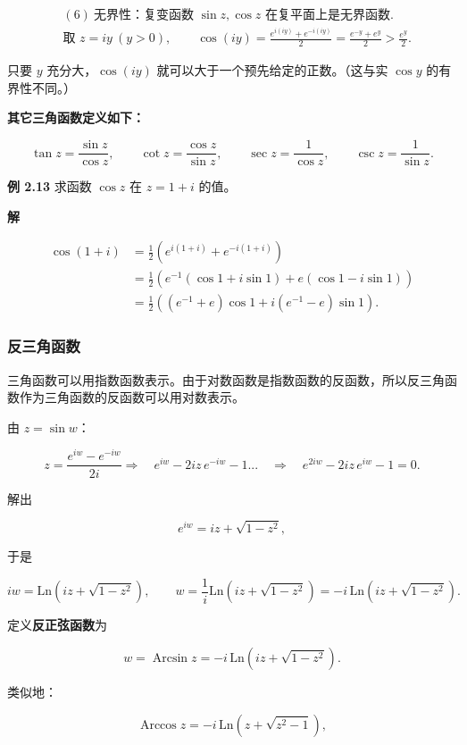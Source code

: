 \[
\begin{aligned}
&(6)\ \text{无界性：复变函数 }\sin z,\cos z\text{ 在复平面上是无界函数}.\\
&\text{取 }z=iy\ (y>0),\qquad
\cos(iy)=\frac{e^{i(iy)}+e^{-i(iy)}}{2}
=\frac{e^{-y}+e^{y}}{2}>\frac{e^y}{2}.
\end{aligned}
\]

只要 \(y\) 充分大，\(\cos(iy)\) 就可以大于一个预先给定的正数。（这与实
\(\cos y\) 的有界性不同。）

\textbf{其它三角函数定义如下：}

\[
\tan z=\frac{\sin z}{\cos z},\qquad
\cot z=\frac{\cos z}{\sin z},\qquad
\sec z=\frac{1}{\cos z},\qquad
\csc z=\frac{1}{\sin z}.
\]

\textbf{例 2.13} 求函数 \(\cos z\) 在 \(z=1+i\) 的值。

\textbf{解}

\[
\begin{aligned}
\cos(1+i)
&=\frac{1}{2}\left(e^{i(1+i)}+e^{-i(1+i)}\right)\\
&=\frac{1}{2}\left(e^{-1}(\cos1+i\sin1)+e(\cos1-i\sin1)\right)\\
&=\frac{1}{2}\left((e^{-1}+e)\cos1+i(e^{-1}-e)\sin1\right).
\end{aligned}
\]

\subsubsection{反三角函数}\label{ux53cdux4e09ux89d2ux51fdux6570}

三角函数可以用指数函数表示。由于对数函数是指数函数的反函数，所以反三角函数作为三角函数的反函数可以用对数表示。

由 \(z=\sin w\)：

\[
z=\frac{e^{iw}-e^{-iw}}{2i}
\Longrightarrow\quad e^{iw}-2iz\,e^{-iw}-1...\quad
\Longrightarrow\quad e^{2iw}-2iz\,e^{iw}-1=0 .
\]

解出

\[
e^{iw}=iz+\sqrt{1-z^2},
\]

于是

\[
iw=\mathrm{Ln}\left(iz+\sqrt{1-z^2}\right),
\qquad
w=\frac{1}{i}\mathrm{Ln}\left(iz+\sqrt{1-z^2}\right)
=-i\,\mathrm{Ln}\left(iz+\sqrt{1-z^2}\right).
\]

定义\textbf{反正弦函数}为

\[
w=\operatorname{Arcsin}z=-i\,\mathrm{Ln}\left(iz+\sqrt{1-z^2}\right).
\]

类似地：

\[
\operatorname{Arccos}z=-i\,\mathrm{Ln}\left(z+\sqrt{z^2-1}\right),
\]

